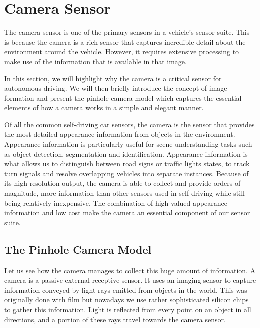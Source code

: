 \section{Camera Sensor}
\label{camera_sensor}

The camera sensor is one of the primary sensors in a vehicle's sensor suite.
This is because the camera is a rich sensor that captures incredible detail
about the environment around the vehicle. However, it requires
extensive processing to make use of the information that is
available in that image. 

In this section, we will highlight why the camera is a critical sensor
for autonomous driving. We will then briefly introduce the concept of
image formation and present the pinhole camera model
which captures the essential elements of how a camera works in a simple
and elegant manner.

Of all the common self-driving car sensors, the camera is the sensor
that provides the most detailed appearance information from objects in the environment. Appearance information
is particularly useful for scene understanding tasks such as object detection, segmentation and identification. 
Appearance information is what allows us to distinguish between road signs or
traffic lights states, to track turn signals and resolve overlapping vehicles
into separate instances. Because of its high
resolution output, the camera is able to collect and provide orders of magnitude, more information than
other sensors used in self-driving while still
being relatively inexpensive. The combination of high valued
appearance information and low cost make
the camera an essential component of our sensor suite. 


\subsection{The Pinhole Camera Model}
\label{pinhole_model}

Let us see how the camera manages to collect this huge amount
of information. A camera is a passive
external receptive sensor. It uses an imaging sensor
to capture information conveyed by light rays emitted
from objects in the world. This was originally done with
film but nowadays we use rather sophisticated
silicon chips to gather this information. Light is reflected
from every point on an object in all directions, and a portion of these rays travel towards the camera sensor. 

